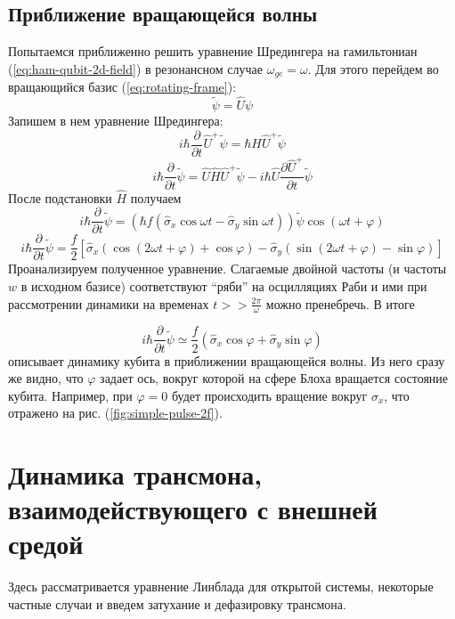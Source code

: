 \documentclass[12pt, twoside]{report}
\numberwithin{equation}{section}
\numberwithin{figure}{section}
\begin{document}
\subsection{Приближение вращающейся волны} \label{subsec:rwa}
Попытаемся приближенно решить уравнение Шредингера на гамильтониан (\ref{eq:ham-qubit-2d-field}) в резонансном случае $\omega_{ge} = \omega$. Для этого перейдем во вращающийся базис (\ref{eq:rotating-frame}):
\begin{equation}
\tilde{\psi} = \hat{U} \psi
\end{equation}
Запишем в нем уравнение Шредингера:
$$ i \hbar \frac{\partial}{\partial t} \hat{U}^{+} \tilde{\psi} = \hbar{H} \hat{U}^{+} \tilde{\psi} $$
$$ i \hbar \frac{\partial}{\partial t} \tilde{\psi} = \hat{U} \hat{H} \hat{U}^{+} \tilde{\psi} - i \hbar \hat{U} \frac{\partial \hat{U}^{+}}{\partial t} \tilde{\psi} $$
После подстановки $\hat{H}$ получаем
$$ i \hbar \frac{\partial}{\partial t} \tilde{\psi} = \left( \hbar f \left( \hat{\sigma}_x \cos \omega t - \hat{\sigma}_y \sin \omega t  \right) \right)\tilde{\psi} \cos \left( \omega t + \varphi \right) $$
$$ i \hbar \frac{\partial}{\partial t} \tilde{\psi} = \frac{f}{2} \left[ \hat{\sigma}_x \left( \cos \left( 2 \omega t + \varphi \right) + \cos \varphi \right) - \hat{\sigma}_y \left( \sin\left(2 \omega t + \varphi \right) - \sin \varphi \right) \right] $$
Проанализируем полученное уравнение. Слагаемые двойной частоты (и частоты $w$ в исходном базисе) соответствуют ``ряби'' на осцилляциях Раби и ими при рассмотрении динамики на временах $  t >> \frac{2 \pi}{\omega} $ можно пренебречь. В итоге

\begin{equation}
 i \hbar \frac{\partial}{\partial t} \tilde{\psi} \simeq \frac{f}{2} \left( \hat{\sigma}_x   \cos \varphi  + \hat{\sigma}_y   \sin \varphi  \right)
\label{eq:rwa-2d}
\end{equation}
описывает динамику кубита в приближении вращающейся волны. Из него сразу же видно, что $\varphi$ задает ось, вокруг которой на сфере Блоха вращается состояние кубита. Например, при $\varphi = 0$ будет происходить вращение вокруг $\sigma_x$, что отражено на рис. (\ref{fig:simple-pulse-2f}).

\section{Динамика трансмона, взаимодействующего с внешней средой}
Здесь рассматривается уравнение Линблада для открытой системы, некоторые частные случаи и введем затухание и дефазировку трансмона.
\end{document}
